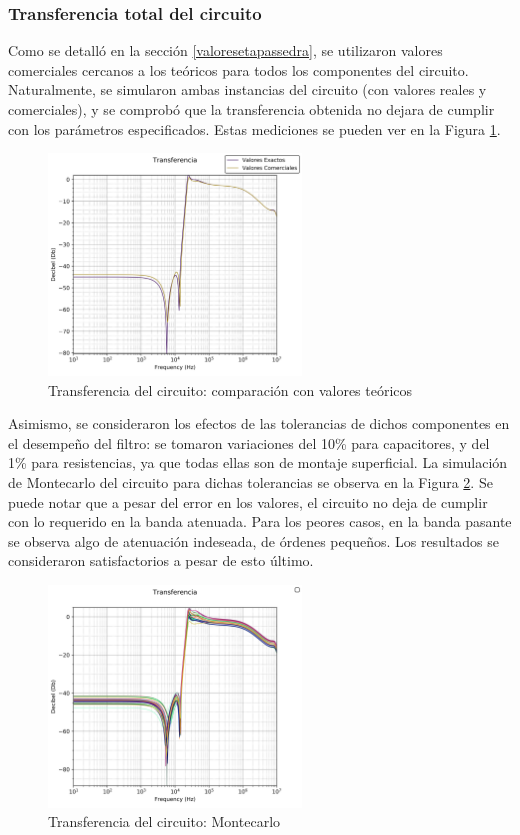 \subsubsection{Transferencia total del circuito} \label{transftotalcirc}
Como se detalló en la sección \ref{valoresetapassedra}, se utilizaron valores comerciales cercanos a los teóricos para todos los componentes del circuito. Naturalmente, se simularon ambas instancias del circuito (con valores reales y comerciales), y se comprobó que la transferencia obtenida no dejara de cumplir con los parámetros especificados. Estas mediciones se pueden ver en la Figura \ref{exactosvscomerciales}.
\begin{figure}[H]
    \centering
    \includegraphics[width=0.6\textwidth]{../Ex3/Resources/exactosvscomerciales.png}
    \caption{Transferencia del circuito: comparación con valores teóricos}
    \label{exactosvscomerciales}
\end{figure}

Asimismo, se consideraron los efectos de las tolerancias de dichos componentes en el desempeño del filtro: se tomaron variaciones del 10\% para capacitores, y del 1\% para resistencias, ya que todas ellas son de montaje superficial. La simulación de Montecarlo del circuito para dichas tolerancias se observa en la Figura \ref{transfmontecarlo}. Se puede notar que a pesar del error en los valores, el circuito no deja de cumplir con lo requerido en la banda atenuada. Para los peores casos, en la banda pasante se observa algo de atenuación indeseada, de órdenes pequeños. Los resultados se consideraron satisfactorios a pesar de esto último.

\begin{figure}[H]
    \centering
    \includegraphics[width=0.6\textwidth]{../Ex3/Resources/transfmontecarlo.png}
    \caption{Transferencia del circuito: Montecarlo}
    \label{transfmontecarlo}
\end{figure}

